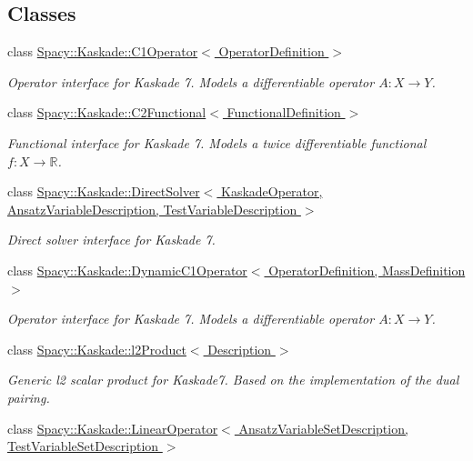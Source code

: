 \subsection*{Classes}
\begin{DoxyCompactItemize}
\item 
class \hyperlink{classSpacy_1_1Kaskade_1_1C1Operator}{Spacy\+::\+Kaskade\+::\+C1\+Operator$<$ Operator\+Definition $>$}
\begin{DoxyCompactList}\small\item\em Operator interface for Kaskade 7. Models a differentiable operator $A:X\rightarrow Y$. \end{DoxyCompactList}\item 
class \hyperlink{classSpacy_1_1Kaskade_1_1C2Functional}{Spacy\+::\+Kaskade\+::\+C2\+Functional$<$ Functional\+Definition $>$}
\begin{DoxyCompactList}\small\item\em Functional interface for Kaskade 7. Models a twice differentiable functional $f:X\rightarrow \mathbb{R}$. \end{DoxyCompactList}\item 
class \hyperlink{classSpacy_1_1Kaskade_1_1DirectSolver}{Spacy\+::\+Kaskade\+::\+Direct\+Solver$<$ Kaskade\+Operator, Ansatz\+Variable\+Description, Test\+Variable\+Description $>$}
\begin{DoxyCompactList}\small\item\em Direct solver interface for Kaskade 7. \end{DoxyCompactList}\item 
class \hyperlink{classSpacy_1_1Kaskade_1_1DynamicC1Operator}{Spacy\+::\+Kaskade\+::\+Dynamic\+C1\+Operator$<$ Operator\+Definition, Mass\+Definition $>$}
\begin{DoxyCompactList}\small\item\em Operator interface for Kaskade 7. Models a differentiable operator $A:X\rightarrow Y$. \end{DoxyCompactList}\item 
class \hyperlink{classSpacy_1_1Kaskade_1_1l2Product}{Spacy\+::\+Kaskade\+::l2\+Product$<$ Description $>$}
\begin{DoxyCompactList}\small\item\em Generic l2 scalar product for Kaskade7. Based on the implementation of the dual pairing. \end{DoxyCompactList}\item 
class \hyperlink{classSpacy_1_1Kaskade_1_1LinearOperator}{Spacy\+::\+Kaskade\+::\+Linear\+Operator$<$ Ansatz\+Variable\+Set\+Description, Test\+Variable\+Set\+Description $>$}

\end{DoxyCompactItemize}
